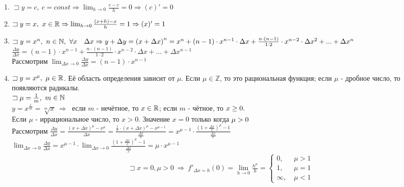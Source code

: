 \documentclass{article}
\begin{document}
\begin{enumerate}
	\item $\sqsupset y = c, \ c = const \Rightarrow \lim_{h \to 0} \frac{c-c}{h} = 0 \Rightarrow (c)' = 0$

	\item $\sqsupset y = x, \ x \in \mathbb{R} \Rightarrow \lim_{h \to 0} \frac{(x+h)-x}{h} = 1 \Rightarrow (x)' = 1$

	\item $\sqsupset y = x^n, \ n \in \N, \ \forall x \quad \Delta x \Rightarrow y + \Delta y = {(x + \Delta x)}^n = x^n + (n-1) \cdot x^{n-1} \cdot \Delta x + \frac{n \cdot (n-1)}{1 \cdot 2} \cdot x^{n-2} \cdot \Delta x^2 + ... + \Delta x^n \newline$ \\
	      $\frac{\Delta y}{\Delta x} = (n-1) \cdot x^{n-1} + \frac{n \cdot (n-1)}{1 \cdot 2} \cdot x^{n-2} \cdot \Delta x + ... + \Delta x^{n-1}$ \\
	      Рассмотрим $\lim_{\Delta x \to 0} \frac{\Delta y}{\Delta x} = (n-1) \cdot x^{n-1}$

	\item $\sqsupset y = x^{\mu}, \ \mu \in \mathbb{R}$. Её область определения зависит от $\mu$. Если $\mu \in \mathbb{Z}$, то это рациональная функция; если $\mu$ - дробное число, то появляются радикалы. \\
	      $\sqsupset \mu = \frac{1}{m}, \ m \in \mathbb{N}$ \\
	      $y = x^{\frac{1}{m}} = \sqrt[m]{x} \ \Rightarrow \ $ если $m$ - нечётное, то $x \in \mathbb{R}$; если $m$ - чётное, то $x \geq 0. \newline$ \\
	      Если $\mu$ - иррациональное число, то $x > 0$. Значение $x = 0$ только когда $\mu > 0 \newline$ \\
	      Рассмотрим $\frac{\Delta y}{\Delta x} = \frac{{(x + \Delta x)}^{\mu} - x^{\mu}}{\Delta x} = \frac{\frac{1}{x} \cdot {(x + \Delta x)}^{\mu} - x^{\mu - 1}}{\frac{\Delta x}{x}} = x^{\mu - 1} \cdot \frac{ {(1 + \frac{\Delta x}{x})}^{\mu} - 1 }{\frac{\Delta x}{x}}$ \\
	      $\lim_{\Delta x \to 0} \frac{\Delta y}{\Delta x} = x^{\mu - 1} \cdot \lim_{\Delta x \to 0} \frac{ {(1 + \frac{\Delta x}{x})}^{\mu} - 1 }{\frac{\Delta x}{x}} = \mu \cdot x^{\mu - 1}$
	      \begin{align*}
		      \sqsupset x = 0, \mu > 0 \ \Rightarrow \ f'_{\Delta x = h} (0) = \lim_{h \to 0} \frac{h^{\mu}}{h} =
		      \begin{cases}
			      0, \       & \mu > 1 \\
			      1, \       & \mu = 1 \\
			      \infty, \  & \mu < 1
		      \end{cases}
	      \end{align*}


\end{enumerate}
\end{document}
